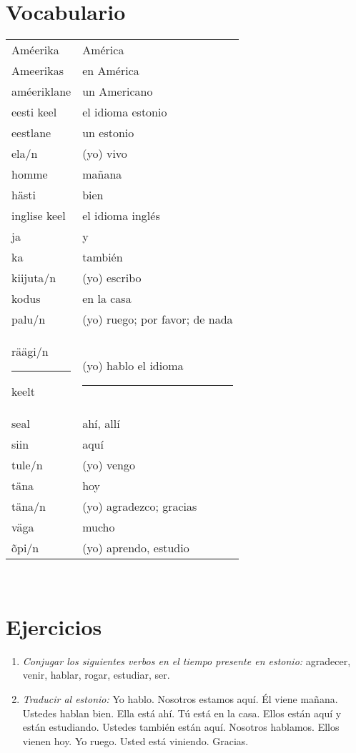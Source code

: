\section*{\Large{Vocabulario}}

\begin{tabular}{ l l }
	Améerika 							& América \\
	Ameerikas 							& en América \\
	améeriklane 						& un Americano \\
	eesti keel 							& el idioma estonio \\
	eestlane 							& un estonio \\
	ela/n 								& (yo) vivo \\
	homme 								& mañana \\
	hästi 								& bien \\
	inglise keel 						& el idioma inglés \\
	ja 									& y \\
	ka 									& también \\
	kiijuta/n 							& (yo) escribo \\
	kodus 								& en la casa \\
	palu/n 								& (yo) ruego; por favor; de nada \\
	räägi/n	\rule{1cm}{0.4pt} keelt 	& (yo) hablo el idioma \rule{1cm}{0.4pt} \\
	seal 								& ahí, allí \\
	siin 								& aquí \\
	tule/n 								& (yo) vengo \\
	täna 								& hoy \\
	täna/n 								& (yo) agradezco; gracias\\
	väga 								& mucho \\
	õpi/n 								& (yo) aprendo, estudio
\end{tabular}\\ \bigskip

\section*{\Large{Ejercicios}}

\begin{enumerate}
	\item \emph{Conjugar los siguientes verbos en el tiempo presente en estonio:} agradecer, venir, hablar, rogar, estudiar, ser.
	\item \emph{Traducir al estonio:} Yo hablo. Nosotros estamos aquí. Él viene mañana. Ustedes hablan bien. Ella está ahí. Tú está en la casa. Ellos están aquí y están estudiando. Ustedes también están aquí. Nosotros hablamos. Ellos vienen hoy. Yo ruego. Usted está viniendo. Gracias.
\end{enumerate}

